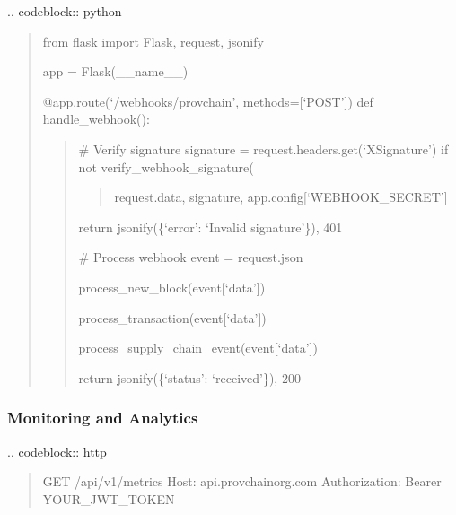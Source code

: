 \documentclass[letterpaper,10pt,english]{sphinxmanual}
\begin{document}
\sphinxAtStartPar
{}
.. code\sphinxhyphen{}block:: python
\begin{quote}

\sphinxAtStartPar
from flask import Flask, request, jsonify

\sphinxAtStartPar
app = Flask(\_\_name\_\_)

\sphinxAtStartPar
@app.route(‘/webhooks/provchain’, methods={[}‘POST’{]})
def handle\_webhook():
\begin{quote}

\sphinxAtStartPar
\# Verify signature
signature = request.headers.get(‘X\sphinxhyphen{}Signature’)
if not verify\_webhook\_signature(
\begin{quote}

\sphinxAtStartPar
request.data,
signature,
app.config{[}‘WEBHOOK\_SECRET’{]}
\end{quote}
\begin{description}
\sphinxlineitem{):}
\sphinxAtStartPar
return jsonify(\{‘error’: ‘Invalid signature’\}), 401

\end{description}

\sphinxAtStartPar
\# Process webhook
event = request.json
\begin{description}
\sphinxAtStartPar
process\_new\_block(event{[}‘data’{]})

\sphinxAtStartPar
process\_transaction(event{[}‘data’{]})

\sphinxAtStartPar
process\_supply\_chain\_event(event{[}‘data’{]})

\end{description}

\sphinxAtStartPar
return jsonify(\{‘status’: ‘received’\}), 200
\end{quote}
\end{quote}


\subsubsection{Monitoring and Analytics}
\label{\detokenize{api/index:monitoring-and-analytics}}
\sphinxAtStartPar
{}
.. code\sphinxhyphen{}block:: http
\begin{quote}

\sphinxAtStartPar
GET /api/v1/metrics
Host: api.provchain\sphinxhyphen{}org.com
Authorization: Bearer YOUR\_JWT\_TOKEN
\end{quote}
\end{document}
